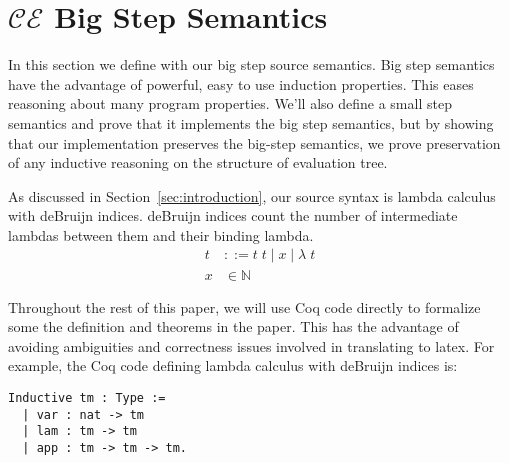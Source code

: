 \section{$\mathcal{CE}$ Big Step Semantics} \label{sec:cem_big}

In this section we define with our big step source semantics. Big step semantics
have the advantage of powerful, easy to use induction properties. This eases
reasoning about many program properties. We'll also define a small step
semantics and prove that it implements the big step semantics, but by showing
that our implementation preserves the big-step semantics, we prove preservation
of any inductive reasoning on the structure of evaluation tree.  

As discussed in Section~\ref{sec:introduction}, our source syntax is lambda calculus with
deBruijn indices. deBruijn indices count the number of intermediate lambdas
between them and their binding lambda.  
\begin{align*}
 t &::= t \; t \; | \; x \; | \;  \lambda \; t \\
 x &\in \mathbb{N}
\end{align*}

Throughout the rest of this paper, we will use Coq code directly to formalize
some the definition and theorems in the paper. This has the advantage of
avoiding ambiguities and correctness issues involved in translating to latex.
For example, the Coq code defining lambda calculus with deBruijn indices is: 

\begin{lstlisting}
Inductive tm : Type := 
  | var : nat -> tm 
  | lam : tm -> tm
  | app : tm -> tm -> tm.
\end{lstlisting}

